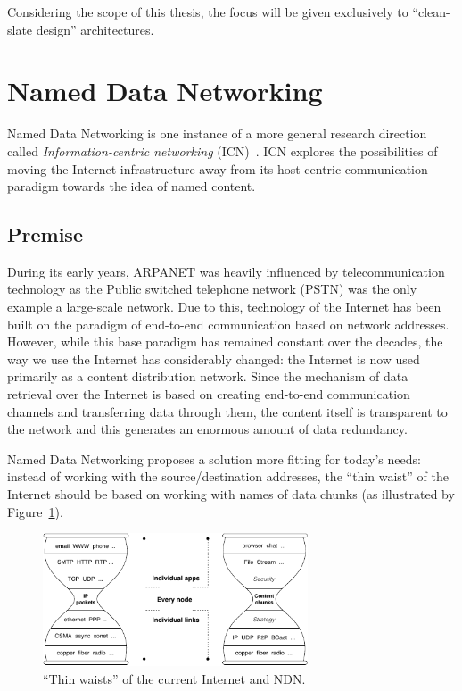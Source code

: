         Considering the scope of this thesis, the focus will be given exclusively to ``clean-slate design'' architectures.

    \section{Named Data Networking}\label{archs:ndn}

        Named Data Networking is one instance of a more general research direction called \emph{Information-centric networking} (ICN)~\cite{icn}. ICN explores the possibilities of moving the Internet infrastructure away from its host-centric communication paradigm towards the idea of named content.

        \subsection{Premise}

            During its early years, ARPANET was heavily influenced by telecommunication technology as the Public switched telephone network (PSTN) was the only example a large-scale network. Due to this, technology of the Internet has been built on the paradigm of end-to-end communication based on network addresses. However, while this base paradigm has remained constant over the decades, the way we use the Internet has considerably changed: the Internet is now used primarily as a content distribution network. Since the mechanism of data retrieval over the Internet is based on creating end-to-end communication channels and transferring data through them, the content itself is transparent to the network and this generates an enormous amount of data redundancy.

            Named Data Networking proposes a solution more fitting for today's needs: instead of working with the source/destination addresses, the ``thin waist'' of the Internet should be based on working with names of data chunks (as illustrated by Figure~\ref{fig:ndn_waist}).

            \begin{figure}[H]
                \begin{center}
                    \includegraphics[width=0.7\textwidth]{fig/archs_ndn-hourglass.pdf}
                  \caption{``Thin waists'' of the current Internet and NDN.}
                  \label{fig:ndn_waist}
                \end{center}
            \end{figure}

